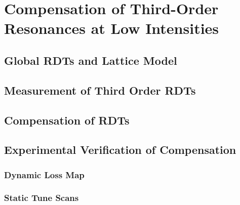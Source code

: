 \chapter{Compensation of Third-Order Resonances at Low Intensities}

\section{Global RDTs and Lattice Model}

\section{Measurement of Third Order RDTs}

\section{Compensation of RDTs}

\section{Experimental Verification of Compensation}

\subsection{Dynamic Loss Map}

\subsection{Static Tune Scans}
